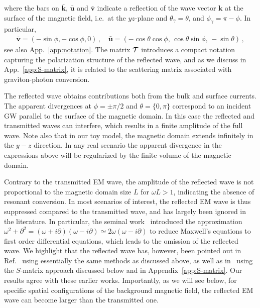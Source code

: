 \documentclass[a4paper,11pt]{article}
\begin{document}
%
where the bars on $\bar{\bm k}$, $\bar{\bm u}$ and $\bar{\bm v}$ indicate a reflection of the wave vector ${\bm k}$ at the surface of the magnetic field, i.e.\ at the $yz$-plane and $\theta_{\gamma} = \theta$, and $ \phi_{\gamma} = \pi - \phi $. 
%
In particular,
%
\begin{align}
 \bar{\bm v}  = (-\sin \phi , -\cos \phi , 0 ) \,, \quad
 \bar{\bm u}  = (- \cos \theta \cos \phi, \, \cos \theta \sin \phi, \, - \sin \theta )\,,
\end{align}
%
see also App.~\ref{app:notation}. 
%
The matrix ${\cal T}$ introduces a compact notation capturing the polarization structure of the reflected wave, and as we discuss in App.~\ref{app:S-matrix}, it is related to the scattering matrix associated with graviton-photon conversion.


The reflected wave obtains contributions both from the bulk and surface currents.
%
The apparent divergences at $\phi = \pm \pi/2$ and $\theta = \{0, \pi\}$ correspond to an incident GW parallel to the surface of the magnetic domain.
%
In this case the reflected and transmitted waves can interfere, which results in a finite amplitude of the full wave. Note also that in our toy model, the magnetic domain extends infinitely in the $y-z$ direction. 
%
In any real scenario the apparent divergence in the expressions above will be regularized by the finite volume of the magnetic domain.



%
Contrary to the transmitted EM wave, the amplitude of the reflected wave is not proportional to the magnetic domain size $L$ for $\omega L > 1$, indicating the absence of resonant conversion.
%
In most scenarios of interest, the reflected EM wave is thus suppressed compared to the transmitted wave, and has largely been ignored in the literature.
%
In particular, the seminal work~\cite{Raffelt:1987im} introduced the approximation $ \omega^{2} + \partial^{2} = (\omega + i \partial ) (\omega - i \partial ) \simeq 2 \omega  (\omega - i \partial )  $ to reduce Maxwell's equations to first order differential equations, which leads to the omission of the reflected wave.
%
We highlight that the reflected wave has, however, been pointed out in Ref.~\cite{Boccaletti:1970pxw} using essentially the same methods as discussed above, as well as in~\cite{DeLogi:1977qe} using the $S$-matrix approach discussed below and in Appendix~\ref{app:S-matrix}.
%
Our results agree with these earlier works.
%
Importantly, as we will see below, for specific spatial configurations of the background magnetic field, the reflected EM wave can become larger than the transmitted one.
\end{document}
